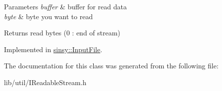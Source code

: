 \begin{DoxyParams}{\-Parameters}
{\em buffer} & buffer for read data \\
\hline
{\em byte} & byte you want to read \\
\hline
\end{DoxyParams}
\begin{DoxyReturn}{\-Returns}
read bytes (0 \-: end of stream) 
\end{DoxyReturn}


\-Implemented in \hyperlink{classsinsy_1_1InputFile_a034391207b94b6b99d8c4a0c0d6f2f44}{sinsy\-::\-Input\-File}.



\-The documentation for this class was generated from the following file\-:\begin{DoxyCompactItemize}
\item 
lib/util/\-I\-Readable\-Stream.\-h\end{DoxyCompactItemize}
